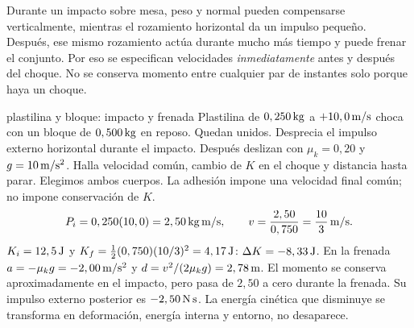 \documentclass[11pt,a4paper]{article}
\begin{document}
Durante un impacto sobre mesa, peso y normal pueden compensarse verticalmente,
mientras el rozamiento horizontal da un impulso peque\~no. Despu\'es, ese mismo
rozamiento act\'ua durante mucho m\'as tiempo y puede frenar el conjunto.
Por eso se especifican velocidades \emph{inmediatamente} antes y despu\'es del choque.
No se conserva momento entre cualquier par de instantes solo porque haya un choque.

\begin{examplebox}{plastilina y bloque: impacto y frenada}
 Plastilina de $0,250\,\mathrm{kg}$ a $+10,0\,\mathrm{m/s}$ choca con un bloque
de $0,500\,\mathrm{kg}$ en reposo. Quedan unidos. Desprecia el impulso externo horizontal
durante el impacto. Despu\'es deslizan con $\mu_k=0,20$ y $g=10\,\mathrm{m/s^2}$.
Halla velocidad com\'un, cambio de $K$ en el choque y distancia hasta parar.
\solutionblock
{} Elegimos ambos cuerpos. La adhesi\'on impone una velocidad final
com\'un; no impone conservaci\'on de $K$.
\[
P_i=0,250(10,0)=2,50\,\mathrm{kg\,m/s},\qquad
v=\frac{2,50}{0,750}=\frac{10}{3}\,\mathrm{m/s}.
\]
$K_i=12,5\,\mathrm{J}$ y
$K_f=\tfrac12(0,750)(10/3)^2=4,17\,\mathrm{J}$:
$\Delta K=-8,33\,\mathrm{J}$.
En la frenada $a=-\mu_kg=-2,00\,\mathrm{m/s^2}$ y
$d=v^2/(2\mu_kg)=2,78\,\mathrm{m}$.
 El momento se conserva aproximadamente en el impacto,
pero pasa de $2,50$ a cero durante la frenada. Su impulso externo posterior es
$-2,50\,\mathrm{N\,s}$. La energ\'ia cin\'etica que disminuye se transforma
en deformaci\'on, energ\'ia interna y entorno, no desaparece.
\end{examplebox}
\end{document}
